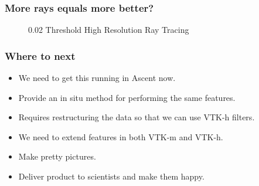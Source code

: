 \documentclass[pdf,8pt]{beamer}
\begin{document}
%
\begin{frame}
\frametitle{More rays equals more better?}
\vspace{-1.4em}
\begin{figure}[h!]
    \caption{0.02 Threshold High Resolution Ray Tracing}
\end{figure}
\end{frame}

\begin{frame}
\frametitle{Where to next}
    \begin{itemize}
        \item We need to get this running in Ascent now.
        \item Provide an in situ method for performing the same features.
        \item Requires restructuring the data so that we can use VTK-h filters.
        \item We need to extend features in both VTK-m and VTK-h.
        \item Make pretty pictures.
        \item Deliver product to scientists and make them happy.
    \end{itemize}
\end{frame}
\end{document}
